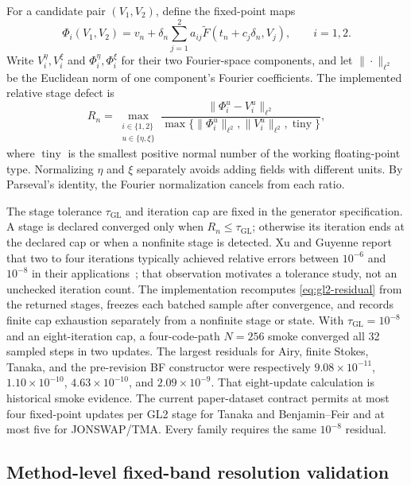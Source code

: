 \documentclass[11pt]{article}
\begin{document}
For a candidate pair $(V_1,V_2)$, define the fixed-point maps
\begin{equation}
  \Phi_i(V_1,V_2)
  =v_n+\delta_n\sum_{j=1}^{2}a_{ij}
       \widetilde F(t_n+c_j\delta_n,V_j),
  \qquad i=1,2.
  \label{eq:gl2-stage-map}
\end{equation}
Write $V_i^\eta,V_i^\xi$ and $\Phi_i^\eta,\Phi_i^\xi$ for their two
Fourier-space components, and let $\|\cdot\|_{\ell^2}$ be the Euclidean norm
of one component's Fourier coefficients.  The implemented relative stage
defect is
\begin{equation}
  R_n
  =
  \max_{\substack{i\in\{1,2\}\\u\in\{\eta,\xi\}}}
  \frac{\|\Phi_i^u-V_i^u\|_{\ell^2}}
       {\max\{\|\Phi_i^u\|_{\ell^2},
              \|V_i^u\|_{\ell^2},
              \operatorname{tiny}\}},
  \label{eq:gl2-residual}
\end{equation}
where $\operatorname{tiny}$ is the smallest positive normal number of the
working floating-point type.  Normalizing $\eta$ and $\xi$ separately avoids
adding fields with different units.  By Parseval's identity, the Fourier
normalization cancels from each ratio.

The stage tolerance $\tau_{\mathrm{GL}}$ and iteration cap are fixed in the
generator specification.  A stage is declared converged only when
$R_n\leq\tau_{\mathrm{GL}}$; otherwise its iteration ends at the declared cap
or when a nonfinite stage is detected.  Xu and Guyenne report that two to four
iterations typically achieved relative errors between $10^{-6}$ and
$10^{-8}$ in their applications~\cite{xu2009}; that observation motivates a
tolerance study, not an unchecked iteration count.  The implementation
recomputes \eqref{eq:gl2-residual} from the returned stages, freezes each
batched sample after convergence, and records finite cap exhaustion
separately from a nonfinite stage or state.  With
$\tau_{\mathrm{GL}}=10^{-8}$ and an eight-iteration cap, a four-code-path
$N=256$ smoke converged all 32 sampled steps in two updates.  The largest
residuals for Airy, finite Stokes, Tanaka, and the pre-revision BF
constructor were respectively
$9.08\times10^{-11}$, $1.10\times10^{-10}$,
$4.63\times10^{-10}$, and $2.09\times10^{-9}$.
That eight-update calculation is historical smoke evidence.  The current
paper-dataset contract permits at most four fixed-point updates per GL2 stage
for Tanaka and Benjamin--Feir and at most five for JONSWAP/TMA.  Every family
requires the same $10^{-8}$ residual.

\subsection{Method-level fixed-band resolution validation}
\end{document}
